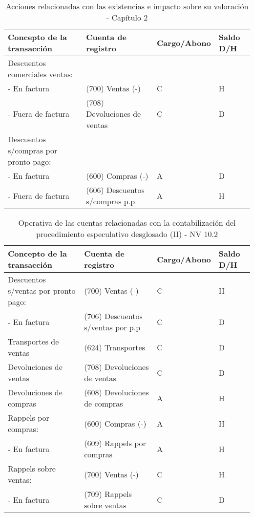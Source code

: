 \documentclass{article}
\begin{document}
\begin{table}[H]
\centering
\begin{tabular}{|p{4cm}|p{4cm}|p{4cm}|p{3cm}|}
\hline
\textbf{Concepto de la transacción} & \textbf{Cuenta de registro} & \textbf{Cargo/Abono} & \textbf{Saldo D/H} \\
\hline
Descuentos comerciales ventas: &  &  &  \\
- En factura & (700) Ventas (-) & C & H \\
- Fuera de factura & (708) Devoluciones de ventas & C & D \\
\hline
Descuentos s/compras por pronto pago: &  &  &  \\
- En factura & (600) Compras (-) & A & D \\
- Fuera de factura & (606) Descuentos s/compras p.p & A & H \\
\hline
\end{tabular}
\caption{Acciones relacionadas con las existencias e impacto sobre su valoración - Capítulo 2}
\end{table}

\begin{table}[H]
    \centering
    \begin{tabular}{|p{5cm}|p{5cm}|p{3cm}|p{3cm}|}
    \hline
    \textbf{Concepto de la transacción} & \textbf{Cuenta de registro} & \textbf{Cargo/Abono} & \textbf{Saldo D/H} \\
    \hline
    Descuentos s/ventas por pronto pago: & (700) Ventas (-) & C & H \\
    - En factura & (706) Descuentos s/ventas por p.p & C & D \\
    \hline
    Transportes de ventas & (624) Transportes & C & D \\
    \hline
    Devoluciones de ventas & (708) Devoluciones de ventas & C & D \\
    \hline
    Devoluciones de compras & (608) Devoluciones de compras & A & H \\
    \hline
    Rappels por compras: & (600) Compras (-) & A & H \\
    - En factura & (609) Rappels por compras & A & H \\
    \hline
    Rappels sobre ventas: & (700) Ventas (-) & C & H \\
    - En factura & (709) Rappels sobre ventas & C & D \\
    \hline
    \end{tabular}
    \caption{Operativa de las cuentas relacionadas con la contabilización del procedimiento especulativo desglosado (II) - NV 10.2}
\end{table}
\end{document}
